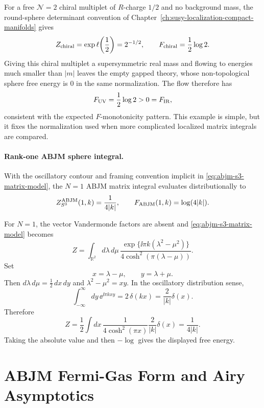 \begin{example}
\label{ex:free-chiral-f-value}
For a free \(\mathcal N=2\) chiral multiplet of \(R\)-charge \(1/2\) and no
background mass, the round-sphere determinant convention of
Chapter~\ref{ch:susy-localization-compact-manifolds} gives
\begin{equation}
  Z_{\rm chiral}=\exp\ell\!\left(\frac12\right)=2^{-1/2},
  \qquad
  F_{\rm chiral}=\frac12\log2 .
  \label{eq:free-chiral-f-value}
\end{equation}
Giving this chiral multiplet a supersymmetric real mass and flowing to
energies much smaller than \(|m|\) leaves the empty gapped theory, whose
non-topological sphere free energy is \(0\) in the same normalization.  The
flow therefore has
\[
  F_{\rm UV}=\frac12\log2>0=F_{\rm IR},
\]
consistent with the expected \(F\)-monotonicity pattern.  This example is
simple, but it fixes the normalization used when more complicated localized
matrix integrals are compared.
\end{example}

\paragraph{Rank-one ABJM sphere integral.}
With the oscillatory contour and framing convention implicit in
\eqref{eq:abjm-s3-matrix-model}, the \(N=1\) ABJM matrix integral evaluates
distributionally to
\begin{equation}
  Z^{\rm ABJM}_{S^3}(1,k)=\frac{1}{4|k|},
  \qquad
  F_{\rm ABJM}(1,k)=\log(4|k|).
  \label{eq:rank-one-abjm-s3-value}
\end{equation}

For \(N=1\), the vector Vandermonde factors are absent and
\eqref{eq:abjm-s3-matrix-model} becomes
\[
  Z
  =
  \int_{\mathbb R^2}d\lambda\,d\mu\,
  \frac{\exp\{\ii\pi k(\lambda^2-\mu^2)\}}
       {4\cosh^2(\pi(\lambda-\mu))}.
\]
Set
\[
  x=\lambda-\mu,\qquad y=\lambda+\mu .
\]
Then \(d\lambda\,d\mu=\frac12\,dx\,dy\) and
\(\lambda^2-\mu^2=xy\).  In the oscillatory distribution sense,
\[
  \int_{-\infty}^{\infty}dy\,\ee^{\ii\pi kxy}
  =
  2\,\delta(kx)
  =
  \frac{2}{|k|}\delta(x).
\]
Therefore
\[
  Z
  =
  \frac12\int dx\,
  \frac{1}{4\cosh^2(\pi x)}
  \frac{2}{|k|}\delta(x)
  =
  \frac{1}{4|k|}.
\]
Taking the absolute value and then \(-\log\) gives the displayed
free energy.

\section{ABJM Fermi-Gas Form and Airy Asymptotics}
\label{sec:abjm-fermi-gas-airy}

